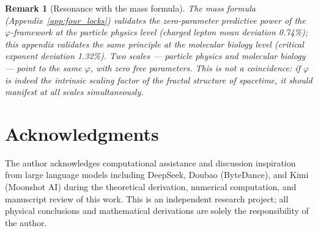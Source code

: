 \documentclass[12pt,a4paper,twocolumn]{article}
\renewcommand{\phi}{\varphi}
\newtheorem{remark}[theorem]{Remark}
\begin{document}
\begin{remark}[Resonance with the mass formula]
The mass formula (Appendix~\ref{app:four_locks}) validates the zero-parameter predictive power of the $\phi$-framework at the particle physics level (charged lepton mean deviation 0.74\%); this appendix validates the same principle at the molecular biology level (critical exponent deviation 1.32\%). Two scales --- particle physics and molecular biology --- point to the same $\phi$, with zero free parameters. This is not a coincidence: if $\phi$ is indeed the intrinsic scaling factor of the fractal structure of spacetime, it should manifest at all scales simultaneously.
\end{remark}


\section*{Acknowledgments}

The author acknowledges computational assistance and discussion inspiration from large language models including DeepSeek, Doubao (ByteDance), and Kimi (Moonshot AI) during the theoretical derivation, numerical computation, and manuscript review of this work. This is an independent research project; all physical conclusions and mathematical derivations are solely the responsibility of the author.

\end{document}
